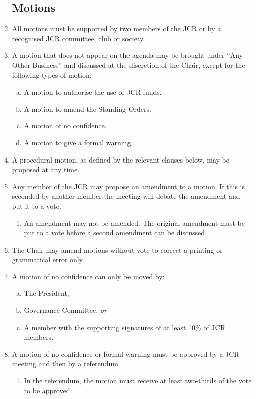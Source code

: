 \documentclass[12pt]{article}
\begin{document}
\begin{enumerate}
    \subsection{Motions}
    \item All motions must be supported by two members of the JCR or by a recognised JCR committee, club or society.
    \item A motion that does not appear on the agenda may be brought under “Any Other Business” and discussed at the discretion of the Chair, except for the following types of motion:
    \begin{enumerate}[(a)]
        \item A motion to authorise the use of JCR funds.
        \item A motion to amend the Standing Orders.
        \item A motion of no confidence.
        \item A motion to give a formal warning.
    \end{enumerate}
    \item A procedural motion, as defined by the relevant clauses below, may be proposed at any time.
    \item Any member of the JCR may propose an amendment to a motion. If this is seconded by another member the meeting will debate the amendment and put it to a vote.
    \begin{enumerate}
        \item An amendment may not be amended. The original amendment must be put to a vote before a second amendment can be discussed.
    \end{enumerate}
    \item The Chair may amend motions without vote to correct a printing or grammatical error only.
    \item A motion of no confidence can only be moved by:
    \begin{enumerate}[(a)]
        \item The President,
        \item Governance Committee, \emph{or}
        \item A member with the supporting signatures of at least 10\% of JCR members.
    \end{enumerate}
    \item A motion of no confidence or formal warning must be approved by a JCR meeting and then by a referendum.
    \begin{enumerate}
        \item In the referendum, the motion must receive at least two-thirds of the vote to be approved.
    \end{enumerate}

\end{enumerate}
\end{document}
